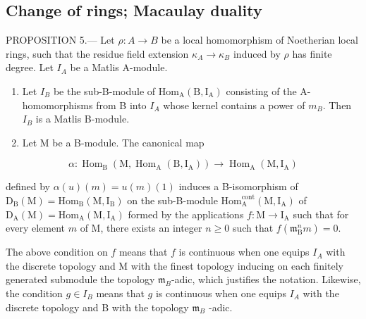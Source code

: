 \subsection{Change of rings; Macaulay duality}

PROPOSITION 5.--- Let \(\rho: A \to B\) be a local homomorphism of Noetherian local rings, such that the residue field extension \(\kappa_A \to \kappa_B\) induced by \(\rho\) has finite degree. Let \(I_A\) be a Matlis A-module.

\begin{enumerate}
\def\labelenumi{\alph{enumi})}
\item
  Let \(I_{B}\) be the sub-B-module of \(\mathrm{Hom}_{\mathrm{A}}(\mathrm{B},\mathrm{I}_{\mathrm{A}})\) consisting of the A-homomorphisms from B into \(I_{A}\) whose kernel contains a power of \(m_{B}\). Then \(I_{B}\) is a Matlis B-module.
\item
  Let M be a B-module. The canonical map
\end{enumerate}

\[
\alpha : \operatorname{Hom} _ {\mathrm{B}} (\mathrm{M}, \operatorname{Hom} _ {\mathrm{A}} (\mathrm{B}, \mathrm{I} _ {\mathrm{A}})) \longrightarrow \operatorname{Hom} _ {\mathrm{A}} (\mathrm{M}, \mathrm{I} _ {\mathrm{A}})
\]

defined by \(\alpha(u)(m)=u(m)(1)\) induces a B-isomorphism of \(\mathrm{D}_{\mathrm{B}}(\mathrm{M})=\mathrm{Hom}_{\mathrm{B}}(\mathrm{M},\mathrm{I}_{\mathrm{B}})\) on the sub-B-module \(\mathrm{Hom}_{\mathrm{A}}^{\mathrm{cont}}(\mathrm{M},\mathrm{I}_{\mathrm{A}})\) of \(\mathrm{D}_{\mathrm{A}}(\mathrm{M})=\mathrm{Hom}_{\mathrm{A}}(\mathrm{M},\mathrm{I}_{\mathrm{A}})\) formed by the applications \(f:\mathrm{M}\to\mathrm{I}_{\mathrm{A}}\) such that for every element \(m\) of M, there exists an integer \(n\geqslant0\) such that \(f(\mathfrak{m}_{\mathrm{B}}^{n}m)=0\).

The above condition on \(f\) means that \(f\) is continuous when one equips \(I_A\) with the discrete topology and M with the finest topology inducing on each finitely generated submodule the topology \(\mathfrak{m}_B\)-adic, which justifies the notation. Likewise, the condition \(g \in I_B\) means that \(g\) is continuous when one equips \(I_A\) with the discrete topology and B with the topology \(\mathfrak{m}_B\) -adic.

